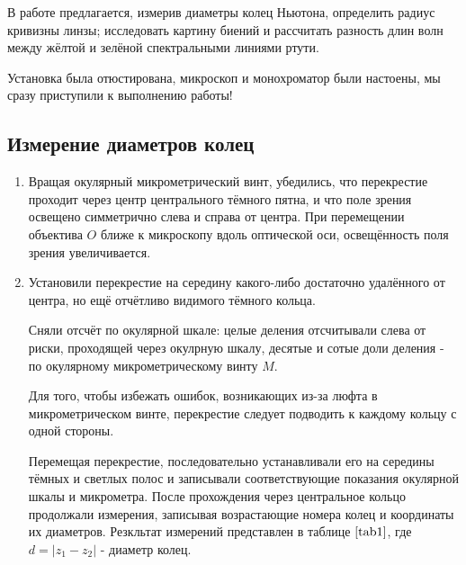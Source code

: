 \documentclass[a4paper,12pt]{article} %
\begin{document}
В работе предлагается, измерив диаметры колец Ньютона, определить радиус кривизны линзы; исследовать картину биений и рассчитать разность длин волн между жёлтой и зелёной спектральными линиями ртути.

Установка была отюстирована, микроскоп и монохроматор были настоены, мы сразу приступили к выполнению работы!

\subsection{Измерение диаметров колец}

\begin{enumerate}
    \item Вращая окулярный микрометрический винт, убедились, что перекрестие проходит через центр центрального тёмного пятна, и что поле зрения освещено симметрично слева и справа от центра. При перемещении объектива $O$ ближе к микроскопу вдоль оптической оси, освещённость поля зрения увеличивается.
    \item Установили перекрестие на середину какого-либо достаточно удалённого от центра, но ещё отчётливо видимого тёмного кольца.

    Сняли отсчёт по окулярной шкале: целые деления отсчитывали слева от риски, проходящей через окулрную шкалу, десятые и сотые доли деления - по окулярному микрометрическому винту $M$.

    Для того, чтобы избежать ошибок, возникающих из-за люфта в микрометрическом винте, перекрестие следует подводить к каждому кольцу с одной стороны.

    Перемещая перекрестие, последовательно устанавливали его на середины тёмных и светлых полос и записывали соответствующие показания окулярной шкалы и микрометра. После прохождения через центральное кольцо продолжали измерения, записывая возрастающие номера колец и координаты их диаметров. Резкльтат измерений представлен в таблице $\ref{tab1}$, где $d=|z_1-z_2|$ - диаметр колец.


\end{enumerate}
\end{document}
